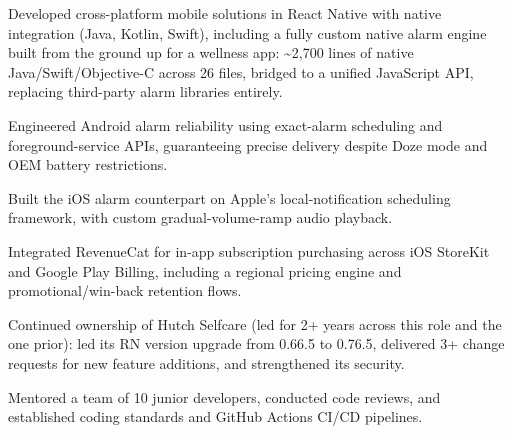 \documentclass[10.5pt]{article}
\begin{document}
\begin{cvitems}
  \item Developed cross-platform mobile solutions in React Native with native integration (Java, Kotlin, Swift), including a fully custom native alarm engine built from the ground up for a wellness app: \textasciitilde2,700 lines of native Java/Swift/Objective-C across 26 files, bridged to a unified JavaScript API, replacing third-party alarm libraries entirely.
  \item Engineered Android alarm reliability using exact-alarm scheduling and foreground-service APIs, guaranteeing precise delivery despite Doze mode and OEM battery restrictions.
  \item Built the iOS alarm counterpart on Apple's local-notification scheduling framework, with custom gradual-volume-ramp audio playback.
  \item Integrated RevenueCat for in-app subscription purchasing across iOS StoreKit and Google Play Billing, including a regional pricing engine and promotional/win-back retention flows.
  \item Continued ownership of Hutch Selfcare (led for 2+ years across this role and the one prior): led its RN version upgrade from 0.66.5 to 0.76.5, delivered 3+ change requests for new feature additions, and strengthened its security.
  \item Mentored a team of 10 junior developers, conducted code reviews, and established coding standards and GitHub Actions CI/CD pipelines.
\end{cvitems}
\end{document}

